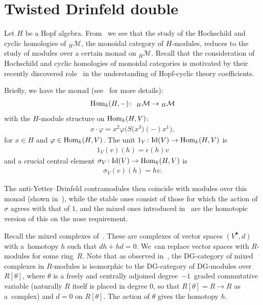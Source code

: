 \documentclass[10pt,a4paper]{amsart}
\numberwithin{equation}{section}
\newcommand{\hmod}{{_H\mathcal{M}}}
\begin{document}
\section{Twisted Drinfeld double}
Let $H$ be a Hopf algebra. From~\cite{chern} we see that the study of the Hochschild and cyclic homologies of $\hmod$, the monoidal category of $H$-modules, reduces to the study of modules over a certain monad on $\hmod$. Recall that the consideration of Hochschild and cyclic homologies of monoidal categories is motivated by their recently discovered role~\cite{chern} in the understanding of Hopf-cyclic theory coefficients.

Briefly, we have the monad (see~\cite{chern} for more details):
\begin{gather}\label{themonad}
\mathop{\rm Hom}\nolimits_k(H,-)\colon \ \hmod\to\hmod
\end{gather}
with the $H$-module structure on $\mathop{\rm Hom}\nolimits_k(H,V)$:
\begin{gather}
x\cdot\varphi=x^2\varphi\big(S\big(x^3\big)(-)x^1\big),
\end{gather}
for $x\in H$ and $\varphi\in \mathop{\rm Hom}\nolimits_k(H,V)$. The unit $1_V\colon {\rm Id}(V)\to \mathop{\rm Hom}\nolimits_k(H,V)$ is
\begin{gather}
1_V(v)(h)=\epsilon(h)v
\end{gather}
and a crucial central element $\sigma_V\colon {\rm Id}(V)\to \mathop{\rm Hom}\nolimits_k(H,V)$ is
\begin{gather}
\sigma_V(v)(h)=hv.
\end{gather}

The anti-Yetter--Drinfeld contramodules then coincide with modules over this monad (shown in~\cite{chern}), while the stable ones consist of those for which the action of $\sigma$ agrees with that of $1$, and the mixed ones introduced in~\cite{chern} are the homotopic version of this on the nose requirement.

Recall the mixed complexes of~\cite{kassel}. These are complexes of vector spaces $(V^\bullet,d)$ with a~homo\-topy $h$ such that $dh+hd=0$. We~can replace vector spaces with $R$-modules for some ring~$R$. Note that as observed in~\cite{kassel}, the DG-category of mixed complexes in $R$-modules is isomorphic to the DG-category of DG-modules over $R[\theta]$, where $\theta$ is a freely and centrally adjoined degree~$-1$~graded commutative variable (naturally $R$ itself is placed in degree $0$, so that $R[\theta]=R\to R$ as a~comp\-lex) and $d=0$ on $R[\theta]$. The action of $\theta$ gives the homotopy $h$.
\end{document}
